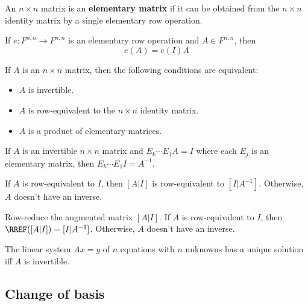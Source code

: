 \begin{definition}
  An $n \times n$ matrix is an \textbf{elementary matrix} if it can be obtained from the $n \times n$ identity matrix by a single elementary row operation.
\end{definition}

\begin{theorem}
  If $e : F^{n,n} \to F^{n,n}$ is an elementary row operation and $A \in F^{n,n}$, then
  \[
    e(A) = e(I) A
  \]
\end{theorem}

\begin{namedtheorem}
  If $A$ is an $n \times n$ matrix, then the following conditions are equivalent:
  \begin{itemize}
    \item $A$ is invertible.
    \item $A$ is row-equivalent to the $n \times n$ identity matrix.
    \item $A$ is a product of elementary matrices.
  \end{itemize}
\end{namedtheorem}

\begin{theorem}
  If $A$ is an invertible $n \times n$ matrix and $E_k \cdots E_1 A = I$ where each $E_j$ is an elementary matrix, then $E_k \cdots E_1 I = A^{-1}$.
\end{theorem}

\begin{lemma}
  If $A$ is row-equivalent to $I$, then $[A | I]$ is row-equivalent to $[I | A^{-1}]$. Otherwise, $A$ doesn't have an inverse.
\end{lemma}

\begin{procedure}[Computation of $A^{-1}$]
  Row-reduce the augmented matrix $[A | I]$. If $A$ is row-equivalent to $I$, then $\RREF([A | I]) = [I | A^{-1}]$. Otherwise, $A$ doesn't have an inverse.
\end{procedure}

\begin{lemma}
  The linear system $Ax = y$ of $n$ equations with $n$ unknowns has a unique solution iff $A$ is invertible.
\end{lemma}

\subsection{Change of basis}

